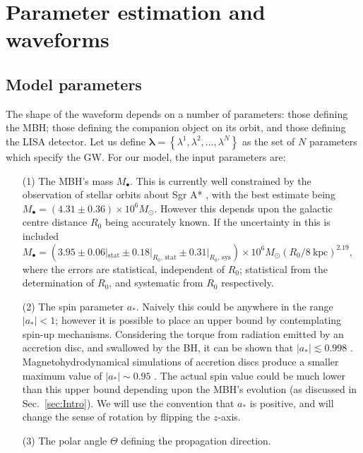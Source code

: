 \documentclass[useAMS,usedcolumn,usegraphicx,usenatbib]{mn2e}
\newcommand{\secref}[1]{Sec.~\ref{sec:#1}}
\newcommand{\units}[1]{\ensuremath{~\mathrm{#1}}}
\newcommand{\sub}[1]{\ensuremath{_\mathrm{#1}}}
\begin{document}
\section{Parameter estimation and waveforms}

\subsection{Model parameters}\label{sec:Parameters}

The shape of the waveform depends on a number of parameters: those defining the MBH; those defining the companion object on its orbit, and those defining the LISA detector. Let us define $\boldsymbol{\lambda} = \left\{\lambda^1, \lambda^2, \ldots, \lambda^N\right\}$ as the set of $N$ parameters which specify the GW. For our model, the input parameters are:
\begin{enumerate}%
\item[(1)] The MBH's mass $M_\bullet$. This is currently well constrained by the observation of stellar orbits about Sgr A* \citep{Ghez2008, Gillessen2009}, with the best estimate being $M_\bullet = (4.31 \pm 0.36) \times 10^6 M_\odot$. However this depends upon the galactic centre distance $R_0$ being accurately known. If the uncertainty in this is included $M_\bullet = (3.95 \pm 0.06|\sub{stat} \pm 0.18|_{R_0, \, \mathrm{stat}} \pm  0.31|_{R_0, \, \mathrm{sys}}) \times 10^6 M_\odot (R_0 / 8\units{kpc})^{2.19}$, where the errors are statistical, independent of $R_0$; statistical from the determination of $R_0$, and systematic from $R_0$ respectively.
\item[(2)] The spin parameter $a_\ast$. Naively this could be anywhere in the range $|a_\ast| < 1$; however it is possible to place an upper bound by contemplating spin-up mechanisms. Considering the torque from radiation emitted by an accretion disc, and swallowed by the BH, it can be shown that $|a_\ast| \lesssim 0.998$ \citep{Thorne1974}. Magnetohydrodynamical simulations of accretion discs produce a smaller maximum value of $|a_\ast| \sim 0.95$ \citep{Gammie2004}. The actual spin value could be much lower than this upper bound depending upon the MBH's evolution (as discussed in \secref{Intro}). We will use the convention that $a_\ast$ is positive, and will change the sense of rotation by flipping the $z$-axis.
\item[(3)] The polar angle $\Theta$ defining the propagation direction.

\end{enumerate}
\end{document}
